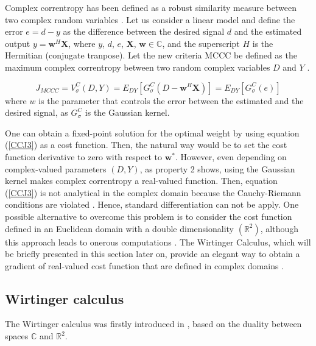\documentclass[preprint,12pt]{elsarticle}
\begin{document}
Complex correntropy has been defined as a robust similarity measure between two complex random variables \citep{7763864}. Let us consider a linear model and define the error $e = d - y$ as the difference between the desired signal $d$ and the estimated output $y = \textbf{w}^H \textbf{X}$, where $y$, $d$, $e$, $\textbf{X}$, $\textbf{w} \in \mathbb{C}$, and the superscript $H$ is the Hermitian (conjugate tranpose). Let the new criteria MCCC be defined as the maximum complex correntropy between two random complex variables $D$ and $Y$ \citep{7763864}.  


 


\begin{equation}\label{CCJ3}
J_{MCCC} = V^{C}_{\sigma}(D, Y) = E_{DY}[G^{C}_{\sigma}(D-\textbf{w}^{H}\textbf{X})] =  E_{DY}[G^{C}_{\sigma}(e)]
\end{equation}
where $w$ is the parameter that controls the error between the estimated and the desired signal, as $G^{C}_{\sigma}$ is the Gaussian kernel. 


One can obtain a fixed-point solution for the optimal weight by using equation (\ref{CCJ3}) as a cost function. Then, the natural way would be to set the cost function derivative to zero with respect to $\textbf{w}^*$. However, even depending on complex-valued parameters $(D,Y)$, as property 2 shows, using the Gaussian kernel makes complex correntropy a real-valued function. Then, equation (\ref{CCJ3}) is not analytical in the complex domain because the Cauchy-Riemann conditions are violated \citep{mandic2009complex}. Hence, standard differentiation can not be apply. One possible alternative to overcome this problem is to consider the cost function defined in an Euclidean domain with a double dimensionality $(\mathbb{R}^2)$, although this approach leads to onerous computations \citep{Bouboulis2011ExtensionLMS}. The Wirtinger Calculus, which will be briefly presented in this section later on, provide an elegant way to obtain a gradient of real-valued cost function that are defined in complex domains \citep{mandic2009complex,Bouboulis2011ExtensionLMS}.

\subsection{Wirtinger calculus}



The Wirtinger calculus was firstly introduced in \citep{Wirtinger1927}, based on the duality between spaces  $\mathbb{C}$ and $\mathbb{R}^{2}$. 
\end{document}
